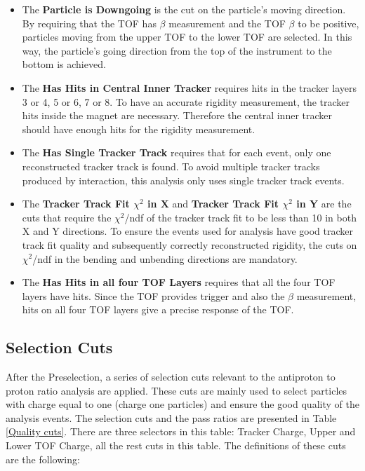 \begin{itemize}
\item The \textbf{Particle is Downgoing} is the cut on the particle’s moving direction. By requiring that the TOF has $\beta$ measurement and the TOF $\beta$ to be positive, particles moving from the upper TOF to the lower TOF are selected. In this way, the particle's going direction from the top of the instrument to the bottom is achieved. 
\item The \textbf{Has Hits in Central Inner Tracker} requires hits in the tracker layers 3 or 4, 5 or 6,  7 or 8. To have an accurate rigidity measurement, the tracker hits inside the magnet are necessary. Therefore the central inner tracker should have enough hits for the rigidity measurement.    
\item The \textbf{Has Single Tracker Track} requires that for each event, only one reconstructed tracker track is found. To avoid multiple tracker tracks produced by interaction, this analysis only uses single tracker track events. 
\item The \textbf{Tracker Track Fit $\chi^2$ in X} and \textbf{Tracker Track Fit $\chi^2$ in Y} are the cuts that require the $\chi^2$/ndf of the tracker track fit to be less than 10 in both X and Y directions. To ensure the events used for analysis have good tracker track fit quality and subsequently correctly reconstructed rigidity, the cuts on $\chi^2$/ndf in the bending and unbending directions are mandatory. 
\item The \textbf{Has Hits in all four TOF Layers} requires that all the four TOF layers have hits. Since the TOF provides trigger and also the $\beta$ measurement, hits on all four TOF layers give a precise response of the TOF.
\end{itemize}

\subsection{Selection Cuts}
After the Preselection, a series of selection cuts relevant to the antiproton to proton ratio analysis are applied. These cuts are mainly used to select particles with charge equal to one (charge one particles) and ensure the good quality of the analysis events. The selection cuts and the pass ratios are presented in Table \ref{Quality cuts}. There are three selectors in this table: Tracker Charge, Upper and Lower TOF Charge, all the rest cuts in this table. The definitions of these cuts are the following: 


